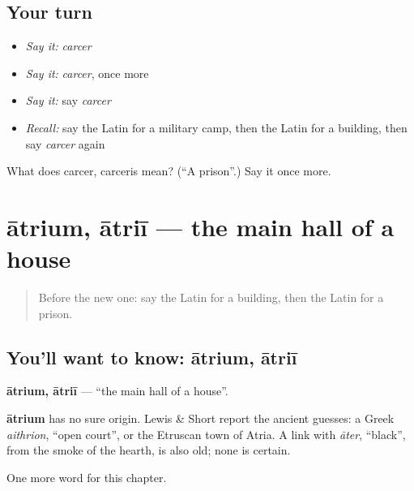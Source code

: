 \subsection*{Your turn}
\begin{itemize}
\raggedright
  \item \emph{Say it:} \emph{carcer}
  \item \emph{Say it:} \emph{carcer}, once more
  \item \emph{Say it:} say \emph{carcer}
  \item \emph{Recall:} say the Latin for a military camp, then the Latin for a building, then say \emph{carcer} again
\end{itemize}

\begin{tcolorbox}[breakable,colback=teal!4,colframe=teal!35!black,title={Before you move on}]
What does carcer, carceris mean? (\textquotedblleft{}A prison\textquotedblright{}.) Say it once more.
\end{tcolorbox}
\section[ātrium, ātriī]{ātrium, ātriī — the main hall of a house}

\label{lesson:LA-C116-atrium}



\begin{quote}
Before the new one: say the Latin for a building, then the Latin for a prison.
\end{quote}

\subsection*{You'll want to know: ātrium, ātriī}
\textbf{ātrium, ātriī} — \textquotedblleft{}the main hall of a house\textquotedblright{}.

\begin{cousinweb}
\textbf{ātrium} has no sure origin. Lewis \& Short report the ancient guesses: a Greek \emph{aithrion}, \textquotedblleft{}open court\textquotedblright{}, or the Etruscan town of Atria. A link with \emph{āter}, \textquotedblleft{}black\textquotedblright{}, from the smoke of the hearth, is also old; none is certain.
\end{cousinweb}

\begin{grammarlens}[title={What you've built}]
One more word for this chapter.
\end{grammarlens}

